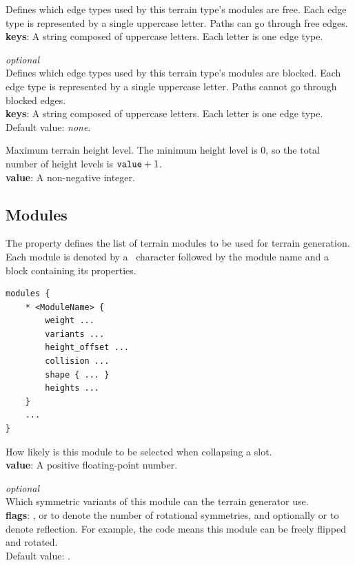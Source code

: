 Defines which edge types used by this terrain type's modules are free.
Each edge type is represented by a single uppercase letter.
Paths can go through free edges.\\
\textbf{keys}: A string composed of uppercase letters. Each letter is one edge type.

\emph{optional}\\
Defines which edge types used by this terrain type's modules are blocked.
Each edge type is represented by a single uppercase letter.
Paths cannot go through blocked edges.\\
\textbf{keys}: A string composed of uppercase letters. Each letter is one edge type.\\
Default value: \emph{none}.

Maximum terrain height level.
The minimum height level is 0, so the total number of height levels is $\texttt{value} + 1$.\\
\textbf{value}: A non-negative integer.

\subsection{Modules}

The  property defines the list of terrain modules to be used for terrain generation.
Each module is denoted by a \mono{*}~character followed by the module name and a block containing its properties.

\begin{verbatim}
modules {
    * <ModuleName> {
        weight ...
        variants ...
        height_offset ...
        collision ...
        shape { ... }
        heights ...
    }
    ...
}
\end{verbatim}

How likely is this module to be selected when collapsing a slot.\\
\textbf{value}: A positive floating-point number.

\emph{optional}\\
Which symmetric variants of this module can the terrain generator use.\\
\textbf{flags}: ,  or  to denote the number of rotational symmetries, and optionally  or  to denote reflection.
For example, the code  means this module can be freely flipped and rotated.\\
Default value: .

